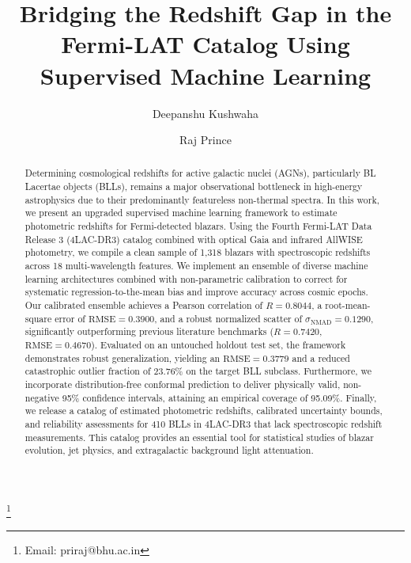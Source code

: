 \documentclass[twocolumn,linenumbers,floatfix]{aastex701}
\begin{document}

\title{Bridging the Redshift Gap in the Fermi-LAT Catalog Using Supervised Machine Learning}%


\author{Deepanshu Kushwaha}

\author{Raj Prince}

\thanks{Email: priraj@bhu.ac.in}




\begin{abstract}
Determining cosmological redshifts for active galactic nuclei (AGNs), particularly BL Lacertae objects (BLLs), remains a major observational bottleneck in high-energy astrophysics due to their predominantly featureless non-thermal spectra. In this work, we present an upgraded supervised machine learning framework to estimate photometric redshifts for Fermi-detected blazars. Using the Fourth Fermi-LAT Data Release 3 (4LAC-DR3) catalog combined with optical Gaia and infrared AllWISE photometry, we compile a clean sample of 1,318 blazars with spectroscopic redshifts across 18 multi-wavelength features. We implement an ensemble of diverse machine learning architectures combined with non-parametric calibration to correct for systematic regression-to-the-mean bias and improve accuracy across cosmic epochs. Our calibrated ensemble achieves a Pearson correlation of $R = 0.8044$, a root-mean-square error of $\text{RMSE} = 0.3900$, and a robust normalized scatter of $\sigma_{\text{NMAD}} = 0.1290$, significantly outperforming previous literature benchmarks ($R = 0.7420$, $\text{RMSE} = 0.4670$). Evaluated on an untouched holdout test set, the framework demonstrates robust generalization, yielding an $\text{RMSE} = 0.3779$ and a reduced catastrophic outlier fraction of $23.76\%$ on the target BLL subclass. Furthermore, we incorporate distribution-free conformal prediction to deliver physically valid, non-negative 95\% confidence intervals, attaining an empirical coverage of 95.09\%. Finally, we release a catalog of estimated photometric redshifts, calibrated uncertainty bounds, and reliability assessments for 410 BLLs in 4LAC-DR3 that lack spectroscopic redshift measurements. This catalog provides an essential tool for statistical studies of blazar evolution, jet physics, and extragalactic background light attenuation.
\end{abstract}
\end{document}
